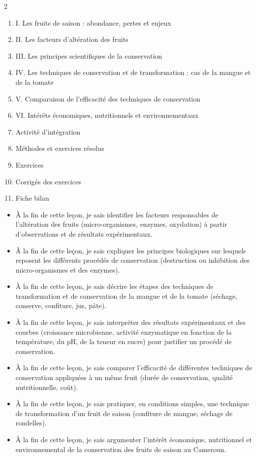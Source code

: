 \documentclass[11pt]{article}
\begin{document}
\begin{sommaire}
\begin{multicols}{2}
\begin{enumerate}
\item I. Les fruits de saison : abondance, pertes et enjeux
\item II. Les facteurs d'altération des fruits
\item III. Les principes scientifiques de la conservation
\item IV. Les techniques de conservation et de transformation : cas de la mangue et de la tomate
\item V. Comparaison de l'efficacité des techniques de conservation
\item VI. Intérêts économiques, nutritionnels et environnementaux
\item Activité d'intégration
\item Méthodes et exercices résolus
\item Exercices
\item Corrigés des exercices
\item Fiche bilan
\end{enumerate}
\end{multicols}
\end{sommaire}

\begin{objectifs}
\begin{itemize}
\item À la fin de cette leçon, je sais identifier les facteurs responsables de l'altération des fruits (micro-organismes, enzymes, oxydation) à partir d'observations et de résultats expérimentaux.
\item À la fin de cette leçon, je sais expliquer les principes biologiques sur lesquels reposent les différents procédés de conservation (destruction ou inhibition des micro-organismes et des enzymes).
\item À la fin de cette leçon, je sais décrire les étapes des techniques de transformation et de conservation de la mangue et de la tomate (séchage, conserve, confiture, jus, pâte).
\item À la fin de cette leçon, je sais interpréter des résultats expérimentaux et des courbes (croissance microbienne, activité enzymatique en fonction de la température, du pH, de la teneur en sucre) pour justifier un procédé de conservation.
\item À la fin de cette leçon, je sais comparer l'efficacité de différentes techniques de conservation appliquées à un même fruit (durée de conservation, qualité nutritionnelle, coût).
\item À la fin de cette leçon, je sais pratiquer, en conditions simples, une technique de transformation d'un fruit de saison (confiture de mangue, séchage de rondelles).
\item À la fin de cette leçon, je sais argumenter l'intérêt économique, nutritionnel et environnemental de la conservation des fruits de saison au Cameroun.
\end{itemize}
\end{objectifs}
\end{document}
